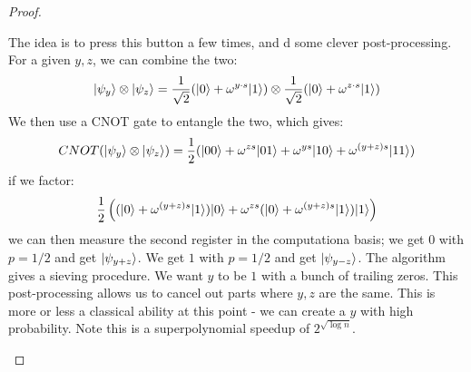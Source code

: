 \begin{proof}
\begin{enumerate}
\begin{enumerate}
\begin{equation}
            \end{equation}
            The idea is to press this button a few times, and d some clever post-processing. For a given $y, z$, we can combine the two:
            \begin{equation}
                \lvert \psi_y \rangle\otimes\lvert \psi_z \rangle = \frac{1}{\sqrt{2}}(\lvert 0 \rangle + \omega^{y\cdot s}\lvert 1 \rangle)\otimes\frac{1}{\sqrt{2}}(\lvert 0 \rangle + \omega^{z\cdot s}\lvert 1 \rangle)
            \end{equation}
            We then use a CNOT gate to entangle the two, which gives:
            \begin{equation}
                CNOT( \lvert \psi_y \rangle\otimes\lvert \psi_z \rangle) = \frac{1}{2}(\lvert 00 \rangle + \omega^{zs}\lvert 01 \rangle + \omega^{ys}\lvert 10 \rangle + \omega^{(y + z)s}\lvert 11 \rangle)
            \end{equation}
            if we factor:
            \begin{equation}
                \frac{1}{2}\left((\lvert 0 \rangle + \omega^{(y + z)s}\lvert 1 \rangle)\lvert 0 \rangle + \omega^{zs}(\lvert 0 \rangle + \omega^{(y + z)s}\lvert 1 \rangle)\lvert 1 \rangle\right)
            \end{equation}
            we can then measure the second register in the computationa basis; we get $0$ with $p = 1/2$ and get $\lvert \psi_{y + z} \rangle$. We get $1$ with $p = 1/2$ and get $\lvert \psi_{y - z} \rangle$. The algorithm gives a sieving procedure. We want $y$ to be $1$ with a bunch of trailing zeros. This post-processing allows us to cancel out parts where $y, z$ are the same. This is more or less a classical ability at this point - we can create a $y$ with high probability. Note this is a superpolynomial speedup of $2^{\sqrt{\log n}}$. 
        \end{enumerate}
    \end{enumerate}
\end{proof}